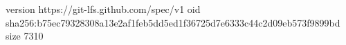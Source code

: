 version https://git-lfs.github.com/spec/v1
oid sha256:b75ec79328308a13e2af1feb5dd5ed1f36725d7e6333c44c2d09eb573f9899bd
size 7310
